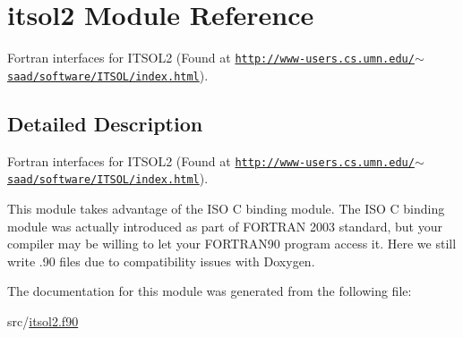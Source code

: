 \hypertarget{classitsol2}{\section{itsol2 Module Reference}
\label{classitsol2}
}


Fortran interfaces for I\-T\-S\-O\-L2 (Found at \href{http://www-users.cs.umn.edu/~saad/software/ITSOL/index.html}{\tt http\-://www-\/users.\-cs.\-umn.\-edu/$\sim$saad/software/\-I\-T\-S\-O\-L/index.\-html}).  




\subsection{Detailed Description}
Fortran interfaces for I\-T\-S\-O\-L2 (Found at \href{http://www-users.cs.umn.edu/~saad/software/ITSOL/index.html}{\tt http\-://www-\/users.\-cs.\-umn.\-edu/$\sim$saad/software/\-I\-T\-S\-O\-L/index.\-html}). 

This module takes advantage of the I\-S\-O C binding module. The I\-S\-O C binding module was actually introduced as part of F\-O\-R\-T\-R\-A\-N 2003 standard, but your compiler may be willing to let your F\-O\-R\-T\-R\-A\-N90 program access it. Here we still write .90 files due to compatibility issues with Doxygen. 

The documentation for this module was generated from the following file\-:\begin{DoxyCompactItemize}
\item 
src/\hyperlink{itsol2_8f90}{itsol2.\-f90}\end{DoxyCompactItemize}
